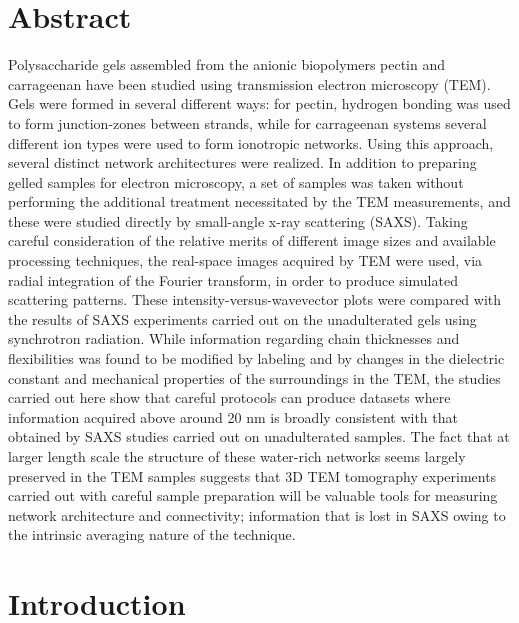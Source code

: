 \section{Abstract}
\noindent
Polysaccharide gels assembled from the anionic biopolymers pectin and carrageenan have been studied using transmission electron microscopy (TEM). Gels were formed in several different ways: for pectin, hydrogen bonding was used to form junction-zones between strands, while for carrageenan systems several different ion types were used to form ionotropic networks. Using this approach, several distinct network architectures were realized. In addition to preparing gelled samples for electron microscopy, a set of samples was taken without performing the additional treatment necessitated by the TEM measurements, and these were studied directly by small-angle x-ray scattering (SAXS). Taking careful consideration of the relative merits of different image sizes and available processing techniques, the real-space images acquired by TEM were used, via radial integration of the Fourier transform, in order to produce simulated scattering patterns. These intensity-versus-wavevector plots were compared with the results of SAXS experiments carried out on the unadulterated gels using synchrotron radiation. While information regarding chain thicknesses and flexibilities was found to be modified by labeling and by changes in the dielectric constant and mechanical properties of the surroundings in the TEM, the studies carried out here show that careful protocols can produce datasets where information acquired above around 20 nm is broadly consistent with that obtained by SAXS studies carried out on unadulterated samples. The fact that at larger length scale the structure of these water-rich networks seems largely preserved in the TEM samples suggests that 3D TEM tomography experiments carried out with careful sample preparation will be valuable tools for measuring network architecture and connectivity; information that is lost in SAXS owing to the intrinsic averaging nature of the technique.

\section{Introduction}

